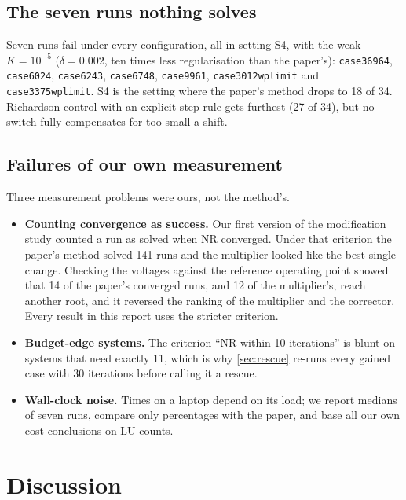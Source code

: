 \documentclass[11pt,a4paper]{article}
\newcommand{\code}[1]{\texttt{#1}}
\begin{document}
\subsection{The seven runs nothing solves}\label{sec:nothing}
Seven runs fail under every configuration, all in setting S4, with the weak $K=10^{-5}$ ($\delta=0.002$, ten
times less regularisation than the paper's): \code{case36964}, \code{case6024}, \code{case6243},
\code{case6748}, \code{case9961}, \code{case3012wplimit} and \code{case3375wplimit}. S4 is the setting where
the paper's method drops to 18 of 34. Richardson control with an explicit step rule gets furthest (27 of 34),
but no switch fully compensates for too small a shift.

\subsection{Failures of our own measurement}
Three measurement problems were ours, not the method's.
\begin{itemize}
  \item \textbf{Counting convergence as success.} Our first version of the modification study counted a run
        as solved when NR converged. Under that criterion the paper's method solved 141 runs and the
        multiplier looked like the best single change. Checking the voltages against the reference
        operating point showed that 14 of the paper's converged runs, and 12 of the multiplier's, reach
        another root, and it reversed the ranking of the multiplier and the corrector. Every result in this
        report uses the stricter criterion.
  \item \textbf{Budget-edge systems.} The criterion ``NR within 10 iterations'' is blunt on systems that
        need exactly 11, which is why \cref{sec:rescue} re-runs every gained case with 30 iterations before
        calling it a rescue.
  \item \textbf{Wall-clock noise.} Times on a laptop depend on its load; we report medians of seven runs,
        compare only percentages with the paper, and base all our own cost conclusions on LU counts.
\end{itemize}

\section{Discussion}\label{sec:discussion}
\end{document}
